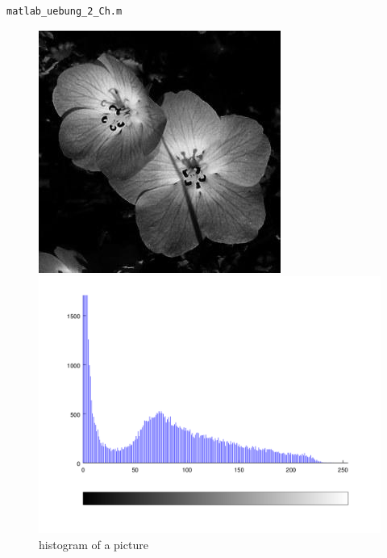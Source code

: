 \documentclass{scrartcl}
\begin{document}
\begin{Verbatim}[frame=bottomline]
matlab_uebung_2_Ch.m
\end{Verbatim}

\begin{figure}[htp!]
	\begin{minipage}[t]{0.5\textwidth}
	\begin{center}
		\includegraphics[scale=0.55]{flower.png}
	\end{center}
	\end{minipage}
	\begin{minipage}[t]{0.5\textwidth}
		\includegraphics[scale=0.5]{histogram_flower.png}
	\end{minipage}
	\caption{histogram of a picture}
	\label{pic:hist_pic}
\end{figure}
\newpage
\end{document}
